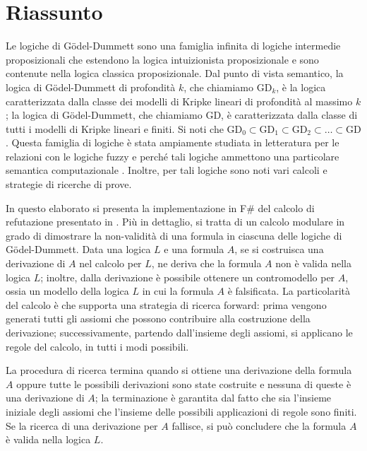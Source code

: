 \documentclass{oist}
\begin{document}
\section*{Riassunto}

Le logiche di G\"odel-Dummett sono una famiglia infinita di logiche
intermedie proposizionali che estendono la logica intuizionista
proposizionale
e sono contenute nella logica classica proposizionale.
Dal punto di vista semantico, la logica di  G\"odel-Dummett di profondit\`a
$k$,
che chiamiamo $\mathrm{GD}_k$,
\`e la logica caratterizzata dalla classe dei modelli di Kripke lineari
di profondit\`a
al massimo $k$; la logica di  G\"odel-Dummett,  che chiamiamo $\mathrm{GD}$,
\`e caratterizzata dalla classe di tutti i  modelli di Kripke lineari e finiti.
Si noti che $\mathrm{GD}_0\subset\mathrm{GD}_1
    \subset\mathrm{GD}_2\subset\dots\subset \mathrm{GD}$.
Questa famiglia di logiche \`e stata ampiamente studiata in letteratura
per le relazioni con le logiche
fuzzy \cite{Hajek:98} e perch\'e tali logiche ammettono una particolare semantica computazionale
\cite{AscCiaGen:2017,Avron:91b}.
Inoltre, per tali logiche sono noti vari calcoli e strategie di ricerche di prove.

In questo elaborato si presenta la implementazione in F\# del calcolo di
refutazione
presentato in \cite{DBLP:conf/cilc/Fiorentini022}.
Pi\`u in dettaglio,
si tratta di un calcolo modulare in grado di dimostrare
la non-validit\`a di una formula in ciascuna delle logiche di
G\"odel-Dummett.
Data una logica $L$ e una formula $A$, se si costruisca una derivazione
di $A$ nel calcolo per $L$,
ne deriva che la formula $A$ non \`e valida nella logica $L$;
inoltre, dalla derivazione \`e possibile ottenere un contromodello per
$A$, ossia un modello
della logica $L$ in cui la formula $A$ \`e falsificata.
La particolarit\`a del calcolo \`e che supporta una strategia di ricerca
forward: prima vengono
generati tutti gli assiomi che possono contribuire alla costruzione
della derivazione;
successivamente, partendo dall'insieme degli assiomi, si applicano le
regole del calcolo, in tutti i modi possibili.

La procedura di ricerca termina quando si ottiene una derivazione della
formula $A$ oppure tutte le possibili derivazioni sono state costruite
e nessuna di queste \`e una derivazione di $A$; la terminazione \`e
garantita
dal fatto che sia l'insieme iniziale degli assiomi che l'insieme delle
possibili applicazioni di regole sono finiti.
Se la ricerca di una derivazione per $A$ fallisce,
si pu\`o concludere che la formula $A$ \`e valida nella logica $L$.
\end{document}
